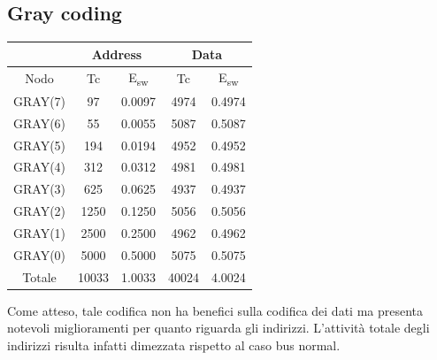 \documentclass[11pt,  english, makeidx, a4paper, titlepage, oneside]{book}
\begin{document}
\subsection{Gray coding}
\begin{center}
	\begin{tabular}{|c|c|c|c|c|}
	\hline
	& \multicolumn{2}{c}{Address} & \multicolumn{2}{c}{Data}\\
	\hline
	Nodo & Tc & E\textsubscript{sw} & Tc & E\textsubscript{sw} \\
	\hline
	GRAY(7) & 97 & 0.0097 & 4974 & 0.4974\\
	 \hline
	GRAY(6) & 55 & 0.0055 & 5087 & 0.5087\\
	\hline
	GRAY(5) & 194 & 0.0194 & 4952 & 0.4952\\
	\hline
	GRAY(4) & 312 & 0.0312 & 4981 & 0.4981\\
	\hline
	GRAY(3) & 625 & 0.0625 & 4937 & 0.4937\\
	\hline
	GRAY(2) & 1250 & 0.1250 & 5056 & 0.5056\\
	\hline
	GRAY(1) & 2500 & 0.2500 & 4962 & 0.4962\\
	\hline
	GRAY(0) & 5000 & 0.5000 & 5075 & 0.5075\\
	\hline
	Totale & 10033 & 1.0033 & 40024 & 4.0024\\
	\hline
	\end{tabular}	
\end{center}
\vspace{0.3cm}
Come atteso, tale codifica non ha benefici sulla codifica dei dati ma presenta notevoli miglioramenti per quanto riguarda gli indirizzi. L'attività totale degli indirizzi risulta infatti dimezzata rispetto al caso bus normal.
\end{document}
